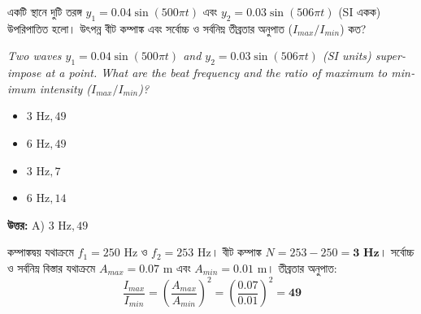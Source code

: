 \documentclass[12pt, a4paper]{article}
\begin{document}
\vspace{2em}

\begin{tcolorbox}[questionbox={প্রশ্ন (Question) 6}]
    \noindent
    একটি স্থানে দুটি তরঙ্গ $y_1 = 0.04 \sin(500\pi t)$ এবং $y_2 = 0.03 \sin(506\pi t)$ (SI একক) উপরিপাতিত হলো। উৎপন্ন বীট কম্পাঙ্ক এবং সর্বোচ্চ ও সর্বনিম্ন তীব্রতার অনুপাত ($I_{max}/I_{min}$) কত?
    
    \vspace{0.8em}
    \begin{english}
    \noindent\textit{\color{darkgray}
    Two waves $y_1 = 0.04 \sin(500\pi t)$ and $y_2 = 0.03 \sin(506\pi t)$ (SI units) superimpose at a point. What are the beat frequency and the ratio of maximum to minimum intensity ($I_{max}/I_{min}$)?
    }
    \end{english}
\end{tcolorbox}

\begin{itemize}[label={}, leftmargin=1cm, itemsep=0.5em]
    \item[\textbf{A)}] $3\text{ Hz}, 49$
    \item[\textbf{B)}] $6\text{ Hz}, 49$
    \item[\textbf{C)}] $3\text{ Hz}, 7$
    \item[\textbf{D)}] $6\text{ Hz}, 14$
\end{itemize}

\vspace{0.5em}
\begin{tcolorbox}[answerbox]
    \textbf{\color{success} উত্তর:} A) $3\text{ Hz}, 49$
\end{tcolorbox}
\vspace{1em}

\begin{tcolorbox}[solutionbox={সমাধান (Solution)}]
    \noindent
    কম্পাঙ্কদ্বয় যথাক্রমে $f_1 = 250\text{ Hz}$ ও $f_2 = 253\text{ Hz}$। বীট কম্পাঙ্ক $N = 253 - 250 = \mathbf{3\text{ Hz}}$। সর্বোচ্চ ও সর্বনিম্ন বিস্তার যথাক্রমে $A_{max} = 0.07\text{ m}$ এবং $A_{min} = 0.01\text{ m}$। তীব্রতার অনুপাত:
    \[ \frac{I_{max}}{I_{min}} = \left(\frac{A_{max}}{A_{min}}\right)^2 = \left(\frac{0.07}{0.01}\right)^2 = \mathbf{49} \]
\end{tcolorbox}

\vspace{2em}
\end{document}
